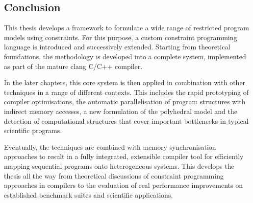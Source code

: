 \subsection{Conclusion}

    This thesis develops a framework to formulate a wide range of restricted
    program models using constraints.
    For this purpose, a custom constraint programming language is introduced
    and successively extended.
    Starting from theoretical foundations, the methodology is developed into
    a complete system, implemented as part of the mature clang C/C++ compiler.

    In the later chapters, this core system is then applied in combination
    with other techniques in a range of different contexts.
    This includes the rapid prototyping of compiler optimisations, the
    automatic parallelisation of program structures with indirect memory
    accesses, a new formulation of the polyhedral model and the detection of
    computational structures that cover important bottlenecks in typical
    scientific programs.
    
    Eventually, the techniques are combined with memory synchronisation
    approaches to result in a fully integrated, extensible compiler tool for
    efficiently mapping sequential programs onto heterogeneous systems.
    This develops the thesis all the way from theoretical discussions of
    constraint programming approaches in compilers to the evaluation of real
    performance improvements on established benchmark suites and scientific
    applications.









